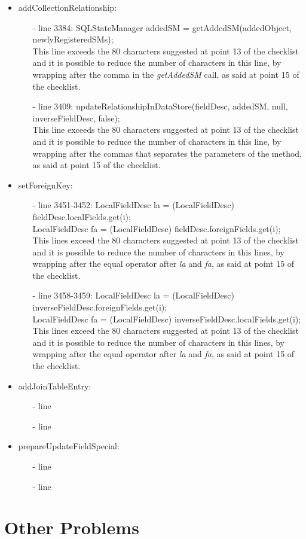 \documentclass[18pt,oneside,a4paper, titlepage]{article}
\begin{document}
\begin{itemize}
\begin{itemize}
				
			\end{itemize}
		\item addCollectionRelationship:
			\begin{itemize}
				\item[-] line 3384:  SQLStateManager addedSM = getAddedSM(addedObject, newlyRegisteredSMs);\\
				This line exceeds the 80 characters suggested at point 13 of the checklist and it is possible to reduce the number of characters in this line, by wrapping after the comma in the \textit{getAddedSM} call, as said at point 15 of the checklist.
				\item[-] line 3409: updateRelationshipInDataStore(fieldDesc, addedSM, null, inverseFieldDesc, false);\\
				This line exceeds the 80 characters suggested at point 13 of the checklist and it is possible to reduce the number of characters in this line, by wrapping after the commas that separates the parameters of the method, as said at point 15 of the checklist.
			\end{itemize}
		\item setForeignKey:
			\begin{itemize}
				\item[-] line 3451-3452: LocalFieldDesc la = (LocalFieldDesc) fieldDesc.localFields.get(i);\\
				LocalFieldDesc fa = (LocalFieldDesc) fieldDesc.foreignFields.get(i);\\
				This lines exceed the 80 characters suggested at point 13 of the checklist and it is possible to reduce the number of characters in this lines, by wrapping after the equal operator after \textit{la} and \textit{fa}, as said at point 15 of the checklist.
				\item[-] line 3458-3459: LocalFieldDesc la = (LocalFieldDesc) inverseFieldDesc.foreignFields.get(i);\\
				LocalFieldDesc fa = (LocalFieldDesc) inverseFieldDesc.localFields.get(i);\\
				This lines exceed the 80 characters suggested at point 13 of the checklist and it is possible to reduce the number of characters in this lines, by wrapping after the equal operator after \textit{la} and \textit{fa}, as said at point 15 of the checklist.
			\end{itemize}
		\item addJoinTableEntry:
		\begin{itemize}
			\item[-] line 
			\item[-] line 
		\end{itemize}
		\item prepareUpdateFieldSpecial:
		\begin{itemize}
			\item[-] line 
			\item[-] line 
		\end{itemize}
		
	\end{itemize}

\newpage
\section{Other Problems}
\end{document}
